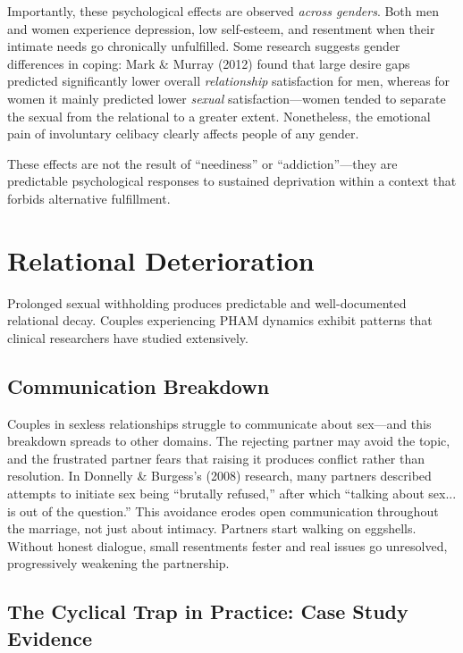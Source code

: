 \documentclass[12pt,openany]{book}
\numberwithin{equation}{chapter}
\begin{document}
Importantly, these psychological effects are observed \textit{across genders}. Both men and women experience depression, low self-esteem, and resentment when their intimate needs go chronically unfulfilled. Some research suggests gender differences in coping: Mark \& Murray (2012) found that large desire gaps predicted significantly lower overall \textit{relationship} satisfaction for men, whereas for women it mainly predicted lower \textit{sexual} satisfaction---women tended to separate the sexual from the relational to a greater extent. Nonetheless, the emotional pain of involuntary celibacy clearly affects people of any gender.

These effects are not the result of ``neediness'' or ``addiction''---they are predictable psychological responses to sustained deprivation within a context that forbids alternative fulfillment.

\section{Relational Deterioration}

Prolonged sexual withholding produces predictable and well-documented relational decay. Couples experiencing PHAM dynamics exhibit patterns that clinical researchers have studied extensively.

\subsection{Communication Breakdown}

Couples in sexless relationships struggle to communicate about sex---and this breakdown spreads to other domains. The rejecting partner may avoid the topic, and the frustrated partner fears that raising it produces conflict rather than resolution. In Donnelly \& Burgess's (2008) research, many partners described attempts to initiate sex being ``brutally refused,'' after which ``talking about sex... is out of the question.'' This avoidance erodes open communication throughout the marriage, not just about intimacy. Partners start walking on eggshells. Without honest dialogue, small resentments fester and real issues go unresolved, progressively weakening the partnership.

\subsection{The Cyclical Trap in Practice: Case Study Evidence}
\end{document}
